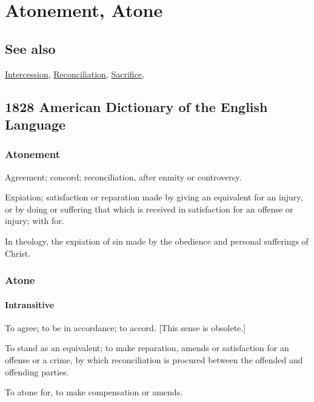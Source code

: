 \section{Atonement, Atone}
	\label{ATONEMENT}
	
\subsection{See also}

	\hyperref[INTERCESSION]{Intercession}, \hyperref[RECONCILIATION]{Reconciliation}, \hyperref[SACRIFICE]{Sacrifice},

\subsection{1828 American Dictionary of the English Language} %
	\label{ATONEMENT-1828}

	\subsubsection{Atonement}

		\begin{compactenum}
			\item Agreement; concord; reconciliation, after enmity or controversy.
			\item Expiation; satisfaction or reparation made by giving an equivalent for an injury, or by doing or suffering that which is received in satisfaction for an offense or injury; with for.
			\item In theology, the expiation of sin made by the obedience and personal sufferings of Christ.
		\end{compactenum}
		
	\subsubsection{Atone}
	
		\paragraph{Intransitive}
		
			\begin{compactenum}
				\item To agree; to be in accordance; to accord. [This sense is obsolete.]
				\item To stand as an equivalent; to make reparation, amends or satisfaction for an offense or a crime, by which reconciliation is procured between the offended and offending parties.
				\item To atone for, to make compensation or amends.
			\end{compactenum}
			
